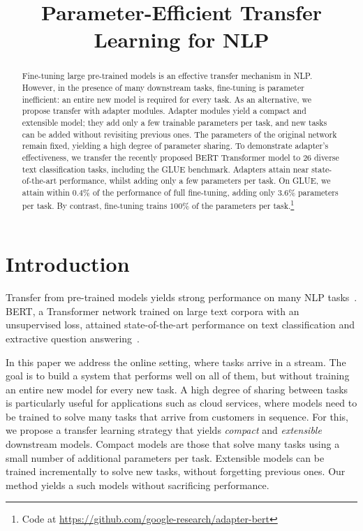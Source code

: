 \title{Parameter-Efficient Transfer Learning for NLP}

\begin{abstract}
Fine-tuning large pre-trained models is an effective transfer mechanism in NLP. However, in the presence of many downstream tasks, fine-tuning is parameter inefficient: an entire new model is required for every task. As an alternative, we propose transfer with adapter modules. Adapter modules yield a compact and extensible model; they add only a few trainable parameters per task, and new tasks can be added without revisiting previous ones. The parameters of the original network remain fixed, yielding a high degree of parameter sharing. To demonstrate adapter's effectiveness, we transfer the recently proposed BERT Transformer model to $26$ diverse text classification tasks, including the GLUE benchmark. Adapters attain near state-of-the-art performance, whilst adding only a few parameters per task. On GLUE, we attain within $0.4\%$ of the performance of full fine-tuning, adding only $3.6\%$ parameters per task. By contrast, fine-tuning trains $100\%$ of the parameters per task.\footnote{Code at \url{https://github.com/google-research/adapter-bert}}
\end{abstract}

\section{Introduction}

Transfer from pre-trained models yields strong performance on many NLP tasks~\citep{dai2015,howard2018universal,radford2018improving}. BERT, a Transformer network trained on large text corpora with an unsupervised loss, attained state-of-the-art performance on text classification and extractive question answering~\citep{devlin2018bert}.

In this paper we address the online setting, where tasks arrive in a stream. The goal is to build a system that performs well on all of them, but without training an entire new model for every new task. A high degree of sharing between tasks is particularly useful for applications such as cloud services, where models need to be trained to solve many tasks that arrive from customers in sequence. For this, we propose a transfer learning strategy that yields \emph{compact} and \emph{extensible} downstream models. Compact models are those that solve many tasks using a small number of additional parameters per task. Extensible models can be trained incrementally to solve new tasks, without forgetting previous ones. Our method yields a such models without sacrificing performance.

